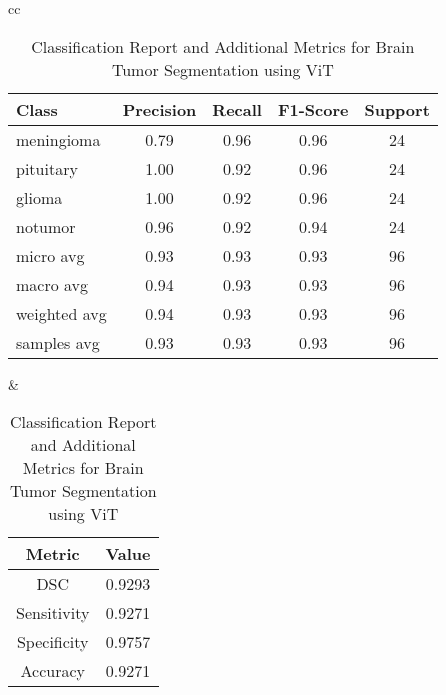 \begin{table}[ht]
\centering
\begin{tabular}{cc}
    \begin{minipage}{.6\linewidth}
        \centering
        \begin{subtable}[t]{\linewidth}
            \centering
            \begin{tabular}{|l|c|c|c|c|}
                \hline 
                \textbf{Class} & \textbf{Precision} & \textbf{Recall} & \textbf{F1-Score} & \textbf{Support} \\ 
                \hline 
                meningioma & 0.79 & 0.96 & 0.96 & 24 \\ 
                \hline
                pituitary  & 1.00 & 0.92 & 0.96 & 24 \\ 
                \hline
                glioma     & 1.00 & 0.92 & 0.96 & 24 \\ 
                \hline
                notumor    & 0.96 & 0.92 & 0.94 & 24 \\ 
                \hline
                micro avg  & 0.93 & 0.93 & 0.93 & 96 \\ 
                \hline
                macro avg  & 0.94 & 0.93 & 0.93 & 96 \\ 
                \hline
                weighted avg & 0.94 & 0.93 & 0.93 & 96 \\ 
                \hline
                samples avg & 0.93 & 0.93 & 0.93 & 96 \\ 
                \hline
            \end{tabular}
            \caption{Classification Report for Brain Tumor Segmentation} 
            \label{tab:vit_classification_report}
        \end{subtable}
    \end{minipage} &
    \begin{minipage}{.35\linewidth}
        \centering
        \begin{subtable}[t]{\linewidth}
            \centering
            \begin{tabular}{|c|c|}
                \hline 
                \textbf{Metric} & \textbf{Value} \\ 
                \hline
                DSC & 0.9293 \\ 
                \hline
                Sensitivity & 0.9271 \\ 
                \hline
                Specificity & 0.9757 \\ 
                \hline
                Accuracy & 0.9271 \\ 
                \hline
            \end{tabular}
            \caption{Additional Metrics for Brain Tumor Segmentation} 
            \label{tab:vit_additional_metrics}
        \end{subtable}
    \end{minipage}
\end{tabular}
\caption{Classification Report and Additional Metrics for Brain Tumor Segmentation using ViT}
\label{tab:combined_metrics}
\end{table}

